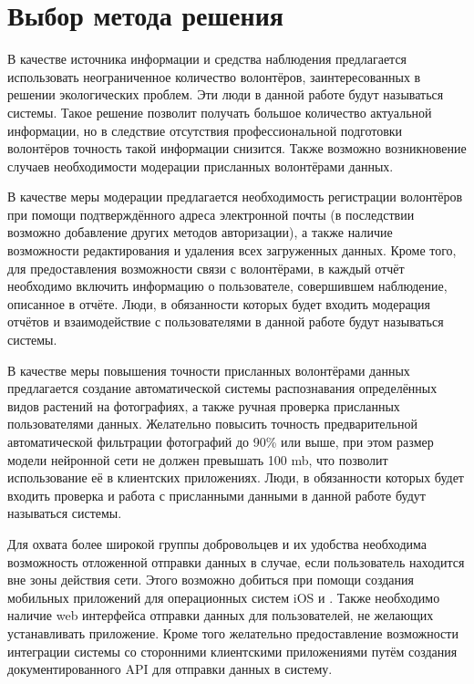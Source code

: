 
\section{Выбор метода решения}

\tab
В качестве источника информации и средства наблюдения предлагается использовать неограниченное количество волонтёров, заинтересованных в решении экологических проблем.
Эти люди в данной работе будут называться  системы.
Такое решение позволит получать большое количество актуальной информации, но в следствие отсутствия профессиональной подготовки волонтёров точность такой информации снизится.
Также возможно возникновение случаев необходимости модерации присланных волонтёрами данных.

\tab
В качестве меры модерации предлагается необходимость регистрации волонтёров при помощи подтверждённого адреса электронной почты (в последствии возможно добавление других методов авторизации), а также наличие возможности редактирования и удаления всех загруженных данных.
Кроме того, для предоставления возможности связи с волонтёрами, в каждый отчёт необходимо включить информацию о пользователе, совершившем наблюдение, описанное в отчёте.
Люди, в обязанности которых будет входить модерация отчётов и взаимодействие с пользователями в данной работе будут называться  системы.

\tab
В качестве меры повышения точности присланных волонтёрами данных предлагается создание автоматической системы распознавания определённых видов растений на фотографиях, а также ручная проверка присланных пользователями данных.
Желательно повысить точность предварительной автоматической фильтрации фотографий до 90\% или выше, при этом размер модели нейронной сети не должен превышать 100 mb, что позволит использование её в клиентских приложениях.
Люди, в обязанности которых будет входить проверка и работа с присланными данными в данной работе будут называться  системы.

\tab
Для охвата более широкой группы добровольцев и их удобства необходима возможность отложенной отправки данных в случае, если пользователь находится вне зоны действия сети.
Этого возможно добиться при помощи создания мобильных приложений для операционных систем iOS и .
Также необходимо наличие web интерфейса отправки данных для пользователей, не желающих устанавливать приложение.
Кроме того желательно предоставление возможности интеграции системы со сторонними клиентскими приложениями путём создания документированного API для отправки данных в систему.

